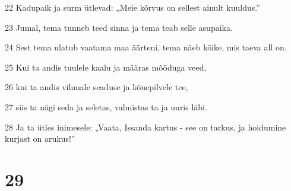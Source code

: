 \par 22 Kadupaik ja surm ütlevad: „Meie kõrvus on sellest ainult kuuldus.”
\par 23 Jumal, tema tunneb teed sinna ja tema teab selle asupaika.
\par 24 Sest tema ulatub vaatama maa äärteni, tema näeb kõike, mis taeva all on.
\par 25 Kui ta andis tuulele kaalu ja määras mõõduga veed,
\par 26 kui ta andis vihmale seaduse ja kõuepilvele tee,
\par 27 siis ta nägi seda ja seletas, valmistas ta ja uuris läbi.
\par 28 Ja ta ütles inimesele: „Vaata, Issanda kartus - see on tarkus, ja hoidumine kurjast on arukus!”

\chapter{29}

